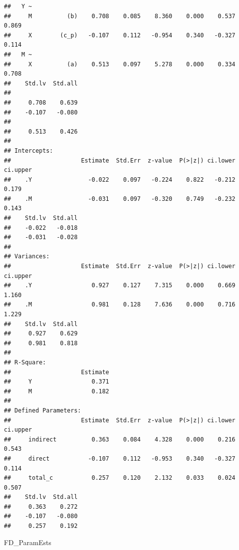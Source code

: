 \documentclass[
  11pt,
]{book}
\newenvironment{Shaded}{\begin{snugshade}}{\end{snugshade}}
\newcommand{\NormalTok}[1]{#1}
\begin{document}
\begin{verbatim}
##   Y ~                                                                   
##     M          (b)    0.708    0.085    8.360    0.000    0.537    0.869
##     X        (c_p)   -0.107    0.112   -0.954    0.340   -0.327    0.114
##   M ~                                                                   
##     X          (a)    0.513    0.097    5.278    0.000    0.334    0.708
##    Std.lv  Std.all
##                   
##     0.708    0.639
##    -0.107   -0.080
##                   
##     0.513    0.426
## 
## Intercepts:
##                    Estimate  Std.Err  z-value  P(>|z|) ci.lower ci.upper
##    .Y                -0.022    0.097   -0.224    0.822   -0.212    0.179
##    .M                -0.031    0.097   -0.320    0.749   -0.232    0.143
##    Std.lv  Std.all
##    -0.022   -0.018
##    -0.031   -0.028
## 
## Variances:
##                    Estimate  Std.Err  z-value  P(>|z|) ci.lower ci.upper
##    .Y                 0.927    0.127    7.315    0.000    0.669    1.160
##    .M                 0.981    0.128    7.636    0.000    0.716    1.229
##    Std.lv  Std.all
##     0.927    0.629
##     0.981    0.818
## 
## R-Square:
##                    Estimate
##     Y                 0.371
##     M                 0.182
## 
## Defined Parameters:
##                    Estimate  Std.Err  z-value  P(>|z|) ci.lower ci.upper
##     indirect          0.363    0.084    4.328    0.000    0.216    0.543
##     direct           -0.107    0.112   -0.953    0.340   -0.327    0.114
##     total_c           0.257    0.120    2.132    0.033    0.024    0.507
##    Std.lv  Std.all
##     0.363    0.272
##    -0.107   -0.080
##     0.257    0.192
\end{verbatim}

\begin{Shaded}
\begin{Highlighting}[]
\NormalTok{FD\_ParamEsts}
\end{Highlighting}
\end{Shaded}
\end{document}
